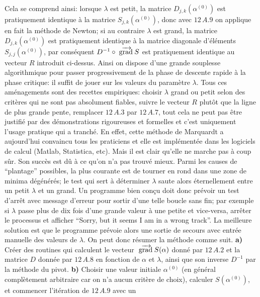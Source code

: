 Cela se comprend ainsi: lorsque $\lambda$ est petit, la matrice 
$D_{j,k}(\alpha^{(0)})$ est pratiquement identique \`a la matrice 
$S_{j,k} (\alpha^{(0)})$, donc avec $12\, A.9$ on applique en fait la
m\'ethode de Newton; si au contraire $\lambda$ est grand, la matrice
$D_{j,k}(\alpha^{(0)})$ est pratiquement identique \`a la matrice
diagonale d'\'el\'ements $S_{j,j}(\alpha^{(0)})$, par cons\'equent
$D^{-1} \circ \grad S$ est pratiquement identique au vecteur $R$ 
introduit ci-dessus. Ainsi on dispose d'une grande souplesse 
algorithmique pour passer progressivement de la phase de descente
rapide \`a la phase critique: il suffit de jouer sur les valeurs du 
param\`etre $\lambda$. 
\medskip 
Tous ces am\'enagements sont des recettes empiriques: choisir
$\lambda$ grand ou petit selon des crit\`eres qui ne sont pas
absolument fiables, suivre le vecteur $R$ plut\^ot que la ligne de plus 
grande pente, remplacer $12\, A.3$ par $12\, A.7$, tout cela ne peut 
pas \^etre justifi\'e par des d\'emonstrations rigoureuses et formelles 
et c'est uniquement l'usage pratique qui a tranch\'e. En effet, 
cette m\'ethode de Marquardt a aujourd'hui convaincu tous les 
praticiens et elle est impl\'ement\'ee dans les logiciels de calcul 
(Matlab, Statistica, etc). Mais il est clair qu'elle ne marche pas \`a 
coup s\^ur. Son succ\`es est d\^u \`a ce qu'on n'a pas trouv\'e mieux. 
\medskip 
Parmi les causes de ``plantage'' possibles, la plus courante est 
de tourner en rond dans une zone de minima d\'eg\'en\'er\'es; le 
test qui sert \`a d\'eterminer $\lambda$ saute alors \'eternellement 
entre un petit $\lambda$ et un grand. Un programme bien con\c{c}u doit 
donc pr\'evoir un test d'arr\^et avec message d'erreur pour sortir 
d'une telle boucle sans fin; par exemple si $\lambda$ passe plus de 
dix fois d'une grande valeur \`a une petite et vice-versa, arr\^eter 
le processus et afficher ``Sorry, but it seems I am in a wrong track''. 
La meilleure solution est que le programme pr\'evoie alors une sortie 
de secours avec entr\'ee manuelle des valeurs de $\lambda$. 
\medskip 
On peut donc r\'esumer la m\'ethode comme suit. 
\smallskip 
{\bf a)} Cr\'eer des routines qui calculent le vecteur $\grad S (\alpha )$ 
donn\'e par $12\, A.2$ et la matrice $D$ donn\'ee par $12\, A.8$ en 
fonction de $\alpha$ et $\lambda$, ainsi que son inverse $D^{-1}$ par 
la m\'ethode du pivot. 
\smallskip 
{\bf b)} Choisir une valeur initiale $\alpha^{(0)}$ (en g\'en\'eral 
compl\`etement arbitraire car on n'a aucun crit\`ere de choix), calculer 
$S(\alpha^{(0)})$, et commencer l'it\'eration de $12\, A.9$ avec un 
